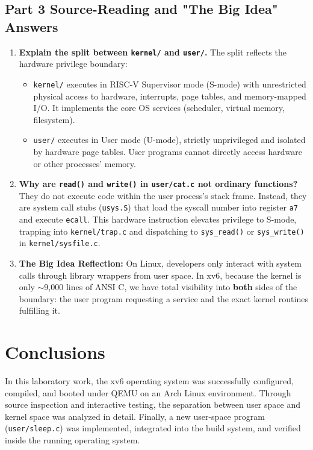 \documentclass[12pt,a4paper]{article}
\begin{document}
\subsection{Part 3 Source-Reading and "The Big Idea" Answers}
\begin{enumerate}
    \item \textbf{Explain the split between \texttt{kernel/} and \texttt{user/}.}
    The split reflects the hardware privilege boundary:
    \begin{itemize}
        \item \texttt{kernel/} executes in RISC-V Supervisor mode (S-mode) with unrestricted physical access to hardware, interrupts, page tables, and memory-mapped I/O. It implements the core OS services (scheduler, virtual memory, filesystem).
        \item \texttt{user/} executes in User mode (U-mode), strictly unprivileged and isolated by hardware page tables. User programs cannot directly access hardware or other processes' memory.
    \end{itemize}

    \item \textbf{Why are \texttt{read()} and \texttt{write()} in \texttt{user/cat.c} not ordinary functions?}
    They do not execute code within the user process's stack frame. Instead, they are system call stubs (\texttt{usys.S}) that load the syscall number into register \texttt{a7} and execute \texttt{ecall}. This hardware instruction elevates privilege to S-mode, trapping into \texttt{kernel/trap.c} and dispatching to \texttt{sys_read()} or \texttt{sys_write()} in \texttt{kernel/sysfile.c}.

    \item \textbf{The Big Idea Reflection:}
    On Linux, developers only interact with system calls through library wrappers from user space. In xv6, because the kernel is only $\sim$9,000 lines of ANSI C, we have total visibility into \textbf{both} sides of the boundary: the user program requesting a service and the exact kernel routines fulfilling it.
\end{enumerate}

\section{Conclusions}
In this laboratory work, the xv6 operating system was successfully configured, compiled, and booted under QEMU on an Arch Linux environment. Through source inspection and interactive testing, the separation between user space and kernel space was analyzed in detail. Finally, a new user-space program (\texttt{user/sleep.c}) was implemented, integrated into the build system, and verified inside the running operating system.
\end{document}
